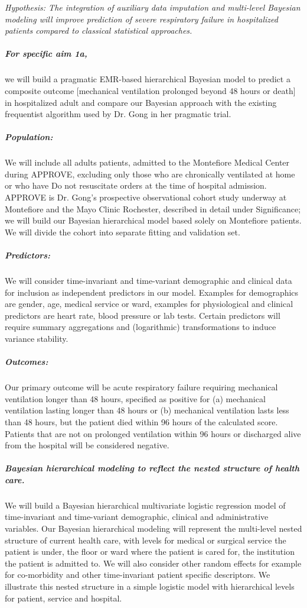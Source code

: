 \documentclass[11pt,notitlepage]{article}
\begin{document}
\textit{Hypothesis: The integration of auxiliary data imputation and multi-level Bayesian modeling will improve prediction of severe respiratory failure in hospitalized patients compared to classical statistical approaches.}


\subparagraph*{For specific aim 1a,} we will build a pragmatic EMR-based hierarchical Bayesian model to predict a composite outcome [mechanical ventilation prolonged beyond 48 hours or death] in hospitalized adult and compare our Bayesian approach with the existing frequentist algorithm used by Dr. Gong in her pragmatic trial.

\subparagraph*{Population:}
We will include all adults patients, admitted to the Montefiore Medical Center during APPROVE, excluding only those who are chronically ventilated at home or who have Do not resuscitate orders at the time of hospital admission. APPROVE is Dr. Gong's prospective observational cohort study underway at Montefiore and the Mayo Clinic Rochester, described in detail under Significance; we will build our Bayesian hierarchical model based solely on Montefiore patients. We will divide the cohort into separate fitting and validation set.

\subparagraph*{Predictors:}
We will consider time-invariant and time-variant demographic and clinical data for inclusion as independent predictors in our model. Examples for demographics are gender, age, medical service or ward, examples for physiological and clinical predictors are heart rate, blood pressure or lab tests. Certain predictors will require summary aggregations and (logarithmic) transformations to induce variance stability.

\subparagraph*{Outcomes:}
Our primary outcome will be acute respiratory failure requiring mechanical ventilation longer than 48 hours, specified as positive for (a) mechanical ventilation lasting longer than 48 hours or (b) mechanical ventilation lasts less than 48 hours, but the patient died within 96 hours of the calculated score. Patients that are not on prolonged ventilation within 96 hours or discharged alive from the hospital will be considered negative.

\subparagraph*{Bayesian hierarchical modeling to reflect the nested structure of health care.}   
We will build a Bayesian hierarchical multivariate logistic regression model of time-invariant and time-variant demographic, clinical and administrative variables. Our Bayesian hierarchical modeling will represent the multi-level nested structure of current health care, with levels for medical or surgical service the patient is under, the floor or ward where the patient is cared for, the institution the patient is admitted to. We will also consider other random effects for example for co-morbidity and other time-invariant patient specific descriptors. We illustrate this nested structure in a simple logistic model with hierarchical levels for patient, service and hospital. 
\end{document}
